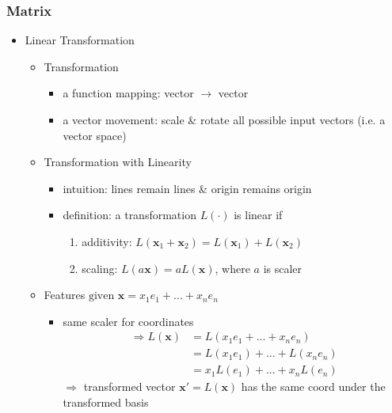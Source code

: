 \subsubsection{Matrix}
\begin{itemize}
\item Linear Transformation
	\begin{itemize}
	\item Transformation
		\begin{itemize}
		\item a function mapping: vector $\rightarrow$ vector
		\item a vector movement: scale \& rotate all possible input vectors (i.e. a vector space)
		\end{itemize}
	\item Transformation with Linearity
		\begin{itemize}
		\item intuition: lines remain lines \& origin remains origin
		\item definition: a transformation $L(\cdot)$ is linear if
			\begin{enumerate}
			\item additivity: $L(\mathbf x_1 + \mathbf x_2) = L(\mathbf x_1) + L(\mathbf x_2)$
			\item scaling: $L(a\mathbf x) = aL(\mathbf x)$, where $a$ is scaler
			\end{enumerate}
		\end{itemize}
	\item Features $\text{given } \mathbf x = x_1e_1 +...+ x_ne_n$
		\begin{itemize}		
		\item same scaler for coordinates
		\abovedisplayshortskip=0pt~\vspace*{-0.5\baselineskip}
		\begin{align*} \Rightarrow L(\mathbf x) &= L(x_1e_1 +...+x_ne_n) \\ &= L(x_1e_1)+...+L(x_ne_n) \\ &= x_1L(e_1)+...+x_nL(e_n) \end{align*}
		$\Rightarrow$ transformed vector $\mathbf x'=L(\mathbf x)$ has the same coord under the transformed basis
		\end{itemize}
	\end{itemize}


\end{itemize}
